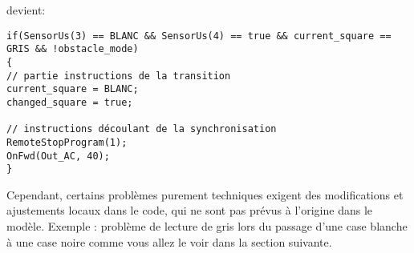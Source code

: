 devient:\newline

\begin{verbatim}
if(SensorUs(3) == BLANC && SensorUs(4) == true && current_square == GRIS && !obstacle_mode)
{
// partie instructions de la transition
current_square = BLANC;
changed_square = true;

// instructions découlant de la synchronisation
RemoteStopProgram(1);
OnFwd(Out_AC, 40);
}
\end{verbatim}


Cependant, certains problèmes purement techniques exigent des modifications et ajustements locaux dans le code, qui ne sont pas prévus à l'origine dans le modèle. Exemple : problème de lecture de gris lors du passage d'une case blanche à une case noire comme vous allez le voir dans la section suivante.